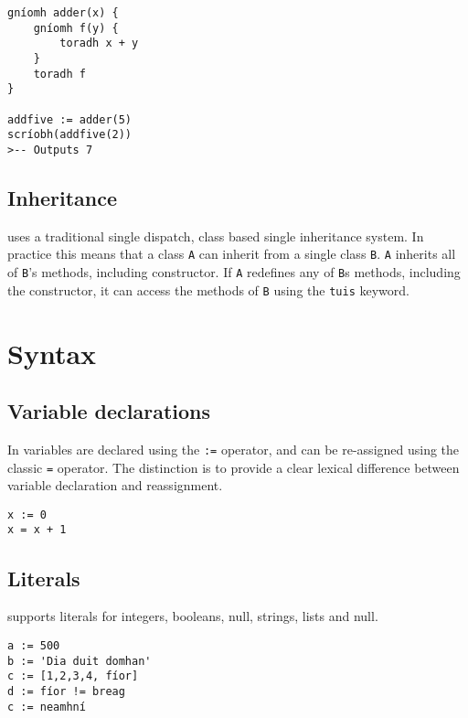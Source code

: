 \begin{lstlisting}[language=setanta, frame=single, caption=Closures]
gníomh adder(x) {
    gníomh f(y) {
        toradh x + y
    }
    toradh f
}

addfive := adder(5)
scríobh(addfive(2))
>-- Outputs 7
\end{lstlisting}

\subsection{Inheritance}

\Setanta{} uses a traditional single dispatch, class based single inheritance system. In practice this means that a class \verb|A| can inherit from a single class \verb|B|. \verb|A| inherits all of \verb|B|'s methods, including constructor. If \verb|A| redefines any of \verb|B|s methods, including the constructor, it can access the methods of \verb|B| using the \lstinline[language=setanta]|tuis| keyword.

\section{Syntax}
\subsection{Variable declarations}\label{variabledeclarations}

        In \Setanta{} variables are declared using the \verb|:=| operator, and can be re-assigned using the classic \verb|=| operator. The distinction is to provide a clear lexical difference between variable declaration and reassignment.

            \begin{lstlisting}[language=setanta, frame=single, caption=Variable declaration and assignment]
x := 0
x = x + 1
            \end{lstlisting}
\subsection{Literals}
\label{setantaliterals}

    \Setanta{} supports literals for integers, booleans, null, strings, lists and null.
    \begin{lstlisting}[language=setanta, frame=single, caption=Setanta literals]
a := 500
b := 'Dia duit domhan'
c := [1,2,3,4, fíor]
d := fíor != breag
c := neamhní
    \end{lstlisting}

